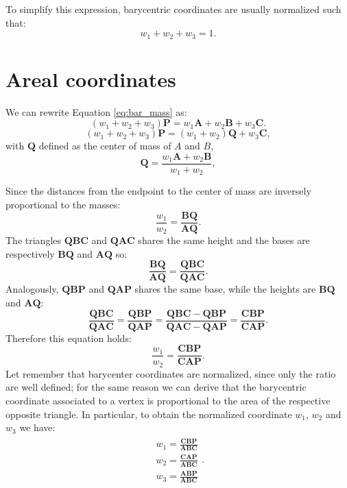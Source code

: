 To simplify this expression, barycentric coordinates are usually normalized such that:
\begin{equation}
  w_1 + w_2 + w_3 = 1.
\end{equation}

\section{Areal coordinates}
We can rewrite Equation \eqref{eq:bar_mass} as:
\begin{equation}
\label{eq:bar_mass2}
 (w_1 + w_2 + w_3) \mathbf{P} =  w_1 \mathbf{A} + w_2 \mathbf{B} + w_3 \mathbf{C}.
\end{equation}
\begin{equation}
\label{eq:bar_mass3}
 (w_1 + w_2 + w_3) \mathbf{P} =  (w_1  + w_2) \mathbf{Q} + w_3 \mathbf{C},
\end{equation}
with $\mathbf{Q}$ defined as the center of mass of $A$ and $B$,
\begin{equation}
 \mathbf{Q} = \frac{w_1 \mathbf{A} + w_2 \mathbf{B}}{w_1 + w_2},
\end{equation}

Since the  distances from the endpoint to the center of mass are inversely proportional to the masses:
\begin{equation}
 \frac{w_1}{w_2} = \frac{\mathbf{BQ}}{\mathbf{AQ}}.
\end{equation}
The triangles $\mathbf{QBC}$ and $\mathbf{QAC}$ shares the same height and the bases are respectively $\mathbf{BQ}$ and $\mathbf{AQ}$ so:
\begin{equation}
 \frac{\mathbf{BQ}}{\mathbf{AQ}}  = \frac{\mathbf{QBC}}{\mathbf{QAC}}.
\end{equation}
Analogously, $\mathbf{QBP}$ and $\mathbf{QAP}$ shares the same base, while the heights are $\mathbf{BQ}$ and $\mathbf{AQ}$:
\begin{equation}
  \frac{\mathbf{QBC}}{\mathbf{QAC}} =  \frac{\mathbf{QBP}}{\mathbf{QAP}} = 
  \frac{\mathbf{QBC-QBP}}{\mathbf{QAC-QAP}} = \frac{\mathbf{CBP}}{\mathbf{CAP}}.
\end{equation}
Therefore this equation holds:
\begin{equation}
  \frac{w_1}{w_2} =  \frac{\mathbf{CBP}}{\mathbf{CAP}}.
\end{equation}
Let remember that barycenter coordinates are normalized, since only the ratio are well defined; for the same reason we can derive that the barycentric coordinate associated to a vertex is proportional to the area of the respective opposite triangle.
In particular, to obtain the normalized coordinate $w_1$, $w_2$ and $w_3$ we have:
\begin{align}
\label{eqn:eqlabel}
\begin{split}
 w_1 =  \frac{\mathbf{CBP}}{\mathbf{ABC}} \\
 w_2 =  \frac{\mathbf{CAP}}{\mathbf{ABC}} \\
 w_3 =  \frac{\mathbf{ABP}}{\mathbf{ABC}} 
\end{split}.
\end{align}


